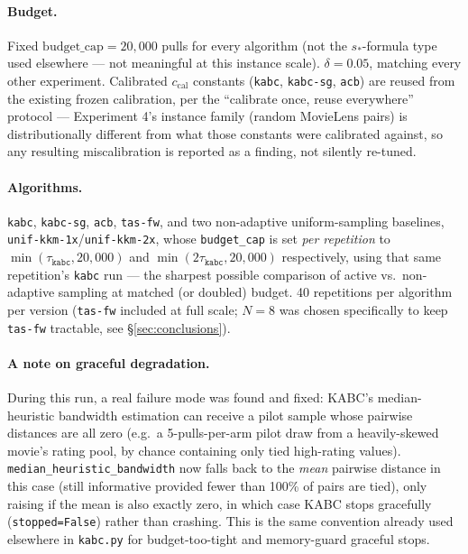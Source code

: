 \documentclass[11pt]{article}
\begin{document}
\paragraph{Budget.} Fixed $\text{budget\_cap}=20{,}000$ pulls for every
algorithm (not the $s_*$-formula type used elsewhere --- not meaningful at
this instance scale). $\delta=0.05$, matching every other experiment.
Calibrated $c_{\text{cal}}$ constants (\texttt{kabc}, \texttt{kabc-sg},
\texttt{acb}) are reused from the existing frozen calibration, per the
``calibrate once, reuse everywhere'' protocol --- Experiment 4's instance
family (random MovieLens pairs) is distributionally different from what
those constants were calibrated against, so any resulting miscalibration is
reported as a finding, not silently re-tuned.

\paragraph{Algorithms.} \texttt{kabc}, \texttt{kabc-sg}, \texttt{acb},
\texttt{tas-fw}, and two non-adaptive uniform-sampling baselines,
\texttt{unif-kkm-1x}/\texttt{unif-kkm-2x}, whose \texttt{budget\_cap} is set
\emph{per repetition} to $\min(\tau_{\texttt{kabc}}, 20{,}000)$ and
$\min(2\tau_{\texttt{kabc}}, 20{,}000)$ respectively, using that same
repetition's \texttt{kabc} run --- the sharpest possible comparison of
active vs.\ non-adaptive sampling at matched (or doubled) budget. 40
repetitions per algorithm per version (\texttt{tas-fw} included at full
scale; $N=8$ was chosen specifically to keep \texttt{tas-fw} tractable, see
\S\ref{sec:conclusions}).

\paragraph{A note on graceful degradation.} During this run, a real failure
mode was found and fixed: KABC's median-heuristic bandwidth estimation can
receive a pilot sample whose pairwise distances are all zero (e.g.\ a
5-pulls-per-arm pilot draw from a heavily-skewed movie's rating pool, by
chance containing only tied high-rating values). \texttt{median\_heuristic\_bandwidth}
now falls back to the \emph{mean} pairwise distance in this case (still
informative provided fewer than 100\% of pairs are tied), only raising if
the mean is also exactly zero, in which case KABC stops gracefully
(\texttt{stopped=False}) rather than crashing. This is the same convention
already used elsewhere in \texttt{kabc.py} for budget-too-tight and
memory-guard graceful stops.
\end{document}
